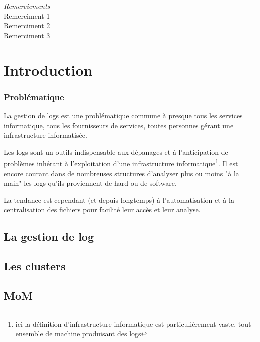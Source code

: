 \documentclass[a4paper,12pt,one side,titlepage]{report}
\begin{document}




\emph{\Large Remerciements}
\\[2cm]
Remerciment 1
\\[1cm]
Remerciment 2
\\[2cm]
Remerciment 3


\setcounter{tocdepth}{1}
\tableofcontents

\part{Introduction}

\section{Problématique}
La gestion de \gls{logs} est une problématique commune à presque tous les services informatique,
tous les fournisseurs de services, toutes personnes gérant une infrastructure informatisée.

Les logs sont un outils indispensable aux dépanages et à l'anticipation de problèmes 
inhérant à l'exploitation d'une infrastructure informatique\footnote{ici la définition
d'infrastructure informatique est particulièrement vaste, tout ensemble de machine
produisant des logs}.
Il est encore courant dans de nombreuses structures d'analyser plus ou moins "à la
main" les logs qu'ils proviennent de hard ou de software.

La tendance est cependant (et depuis longtemps) à l'automatisation et à la centralisation
des fichiers pour facilité leur accès et leur analyse.

\chapter{La gestion de log}

\lipsum
\chapter{Les clusters}

\lipsum

\chapter{MoM}

\lipsum
\lipsum
\end{document}
